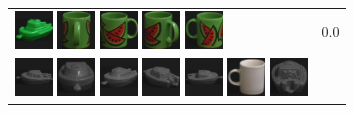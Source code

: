 {\begin{figure}[p]
\begin{tabular}{m{11cm} | m{3cm} |}
\includegraphics[width=1cm]{coil/beeld-57.eps}
\includegraphics[width=1cm]{coil/beeld-35.eps}
\includegraphics[width=1cm]{coil/beeld-30.eps}
\includegraphics[width=1cm]{coil/beeld-34.eps}
\includegraphics[width=1cm]{coil/beeld-31.eps}
& {\scriptsize 0.0}
\\
\includegraphics[width=1cm]{coil/beeld-24.eps}
\includegraphics[width=1cm]{coil/beeld-28.eps}
\includegraphics[width=1cm]{coil/beeld-29.eps}
\includegraphics[width=1cm]{coil/beeld-25.eps}
\includegraphics[width=1cm]{coil/beeld-27.eps}
\includegraphics[width=1cm]{coil/beeld-37.eps}
\includegraphics[width=1cm]{coil/beeld-26.eps}

\end{tabular}
\end{figure}}
